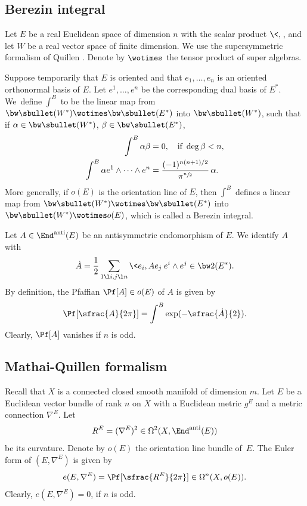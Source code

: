 \subsection{Berezin integral}\label{sec:Bere}
Let $E$ be a real Euclidean space of dimension $n$ with
the scalar product $\<,\>$, and let $W$ be a real vector space of
finite dimension. We use the supersymmetric formalism of Quillen
\cite{Quillensuper}. Denote by $\wotimes$ the tensor product of super algebras.

Suppose temporarily that $E$ is oriented and that $e_1,\ldots, e_n$
is an oriented orthonormal basis of $E$. Let $e^1,\ldots,e^n$ be the corresponding dual basis of $E^*$. We~define $\int^B$ to be the linear map from $\bw\sbullet(W^*)\wotimes\bw\sbullet(E^*)$ into $\bw\sbullet(W^*)$, such that if $\alpha\in \bw\sbullet(W^*)$, $\beta\in \bw\sbullet(E^*)$,
\begin{equation*}\label{eq:defBere}
\begin{split}
\int^B\alpha\beta&=0, \quad\text{if } \deg \beta<n,\\
\int^B\alpha
e^1\wedge\cdots\wedge e^n&=\frac{(-1)^{n(n+1)/2}}{\pi^{\sfrac{n}{2}}}\,\alpha.
\end{split}
\end{equation*}
More generally, if $o(E)$ is the orientation line of $E$, then $\int^B$ defines a linear map from $\bw\sbullet(W^*)\wotimes\bw\sbullet(E^*)$ into $\bw\sbullet(W^*)\wotimes o(E)$, which is called a Berezin integral.

Let $A\in \End^{\mathrm{anti}}(E)$ be an antisymmetric endomorphism of $E$. We identify $A$ with
\begin{equation}\label{eq:ALam}
\dot{A}=\frac{1}{2}\sum_{1\l i,j\l n}\<e_i,Ae_j\>e^i\wedge e^j\in \bw2(E^*).
\end{equation}
By definition, the Pfaffian $\Pf[A]\in o(E)$ of $A$ is given by
\begin{equation*}\label{eq:PfA}
\Pf[\sfrac{A}{2\pi}]=\int^B\exp(-\sfrac{\dot{A}}{2}).
\end{equation*}
Clearly, $\Pf[A]$ vanishes if $n$ is odd.

\subsection{Mathai-Quillen formalism}\label{sMQ}
Recall that $X$ is a connected closed smooth manifold of dimension $m$. Let
$E$ be a Euclidean vector bundle of rank $n$ on $X$ with a Euclidean
metric $g^{E}$ and a metric connection $\nabla^{E}$. Let
\[
R^{E}=(\nabla^{E})^{2}\in\Omega^{2}(X,\End^\mathrm{anti}(E))
\]
be its curvature. Denote by $o(E)$ the orientation line
bundle of~$E$.
The Euler form of
$(E,\nabla^{E})$ is given by
\begin{equation*}
e(E,\nabla^{E})=\Pf[\sfrac{R^{E}}{2\pi}] \in
\Omega^{n}(X,o(E)).
\end{equation*}
Clearly, $e(E,\nabla^{E})=0$, if $n$ is odd.

